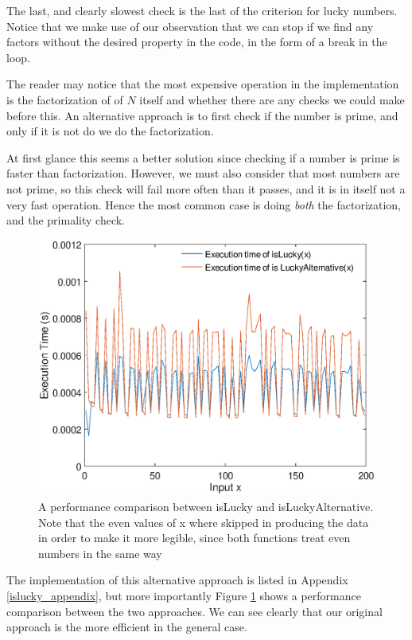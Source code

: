 \documentclass[10pt]{article}
\begin{document}
The last, and clearly slowest check is the last  of the criterion for lucky numbers. Notice that we make use of our observation that we can stop if we find any factors without the desired property in the code, in the form of a break in the loop.

The reader may notice that the most expensive operation in the implementation is the factorization of of $N$ itself and whether there are any checks we could make before this. An alternative approach is to first check if the number is prime, and only if it is not do we do the factorization. 

At first glance this seems a better solution since checking if a number is prime is faster than factorization. However, we must also consider that most numbers are not prime, so this check will fail more often than it passes, and it is in itself not a very fast operation. Hence the most common case is doing \emph{both} the factorization, and the primality check.


\begin{figure}

   \includegraphics[scale=0.6]{islucky_test.eps}

   \caption{A performance comparison between isLucky and isLuckyAlternative. Note that the even values of x where skipped in producing the data in order to make it more legible, since both functions treat even numbers in the same way}
      \label{isluckytest}
\end{figure}


The implementation of this alternative approach is listed in Appendix \ref{islucky_appendix}, but more importantly Figure \ref{isluckytest} shows a performance comparison between the two approaches. We can see clearly that our original approach is the more efficient in the general case.
\end{document}
